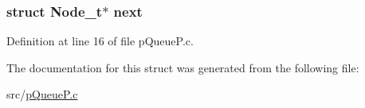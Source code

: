 \hypertarget{struct_node__t_a5e58c48351200ad246d4db491634433c}{
\subsubsection[{next}]{\setlength{\rightskip}{0pt plus 5cm}struct {\bf Node\_\-t}$\ast$ {\bf next}}}
\label{struct_node__t_a5e58c48351200ad246d4db491634433c}


Definition at line 16 of file pQueueP.c.



The documentation for this struct was generated from the following file:\begin{DoxyCompactItemize}
\item 
src/\hyperlink{p_queue_p_8c}{pQueueP.c}\end{DoxyCompactItemize}
